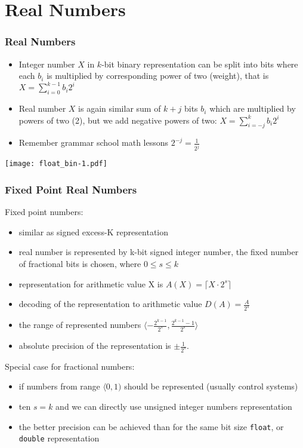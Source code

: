 \documentclass{beamer}
\begin{document}
\section{Real Numbers}


\begin{frame}
\frametitle{Real Numbers}

\begin{itemize}
\item Integer number $X$ in $k$-bit binary representation can be split into bits where each $b_i$ is multiplied by corresponding power of two (weight), that is $ X = \sum_{i=0}^{k-1} b_i 2^{i} $
\item Real number $X$ is again similar sum of $k+j$ bits $b_i$ which are multiplied by powers of two (2), but we add negative powers of two: $X = \sum_{i=-j}^{k} b_i 2^{i}$
\item Remember grammar school math lessons $2^{-j} = \frac{1}{2^j}$
\end{itemize}


\begin{center}
\texttt{[image: float\_bin-1.pdf]}
\end{center}

\end{frame}


\begin{frame}
\frametitle{Fixed Point Real Numbers}

Fixed point numbers:

\begin{itemize}
\item similar as signed excess-K representation
\item real number is represented by k-bit signed integer number, the fixed number of fractional bits is chosen, where $0 \le s \le k$
\item representation for arithmetic value X is $A(X) = \lceil X \cdot 2^s \rceil$
\item decoding of the representation to arithmetic value $D(A) = \frac{A}{2^s}$
\item the range of represented numbers $\langle -\frac{2^{k-1}}{2^s}, \frac{2^{k-1}-1}{2^s} \rangle$
\item absolute precision of the representation is $\pm \frac{1}{2^s}$.
\end{itemize}

 Special case for fractional numbers:
\begin{itemize}
\item if numbers from range $\langle 0,1)$ should be represented (usually control systems)
\item ten $s=k$ and we can directly use unsigned integer numbers representation
\item the better precision can be achieved than for the same bit size \texttt{float}, or \texttt{double} representation
\end{itemize}

\end{frame}
\end{document}
